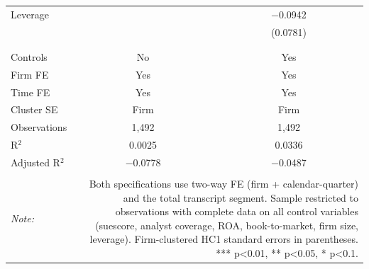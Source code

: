 \begin{table}[!htbp]
\begin{tabular}{@{\extracolsep{5pt}}lcc}
 Leverage &  & $-$0.0942 \\ 
  &  & (0.0781) \\ 
  & & \\ 
\hline \\[-1.8ex] 
Controls & No & Yes \\ 
Firm FE & Yes & Yes \\ 
Time FE & Yes & Yes \\ 
Cluster SE & Firm & Firm \\ 
Observations & 1,492 & 1,492 \\ 
R$^{2}$ & 0.0025 & 0.0336 \\ 
Adjusted R$^{2}$ & $-$0.0778 & $-$0.0487 \\ 
\hline 
\hline \\[-1.8ex] 
\textit{Note:}  & \multicolumn{2}{r}{Both specifications use two-way FE (firm + calendar-quarter) and the total transcript segment. Sample restricted to observations with complete data on all control variables (suescore, analyst coverage, ROA, book-to-market, firm size, leverage). Firm-clustered HC1 standard errors in parentheses. *** p<0.01, ** p<0.05, * p<0.1.} \\ 
\end{tabular} 
\end{table} 

